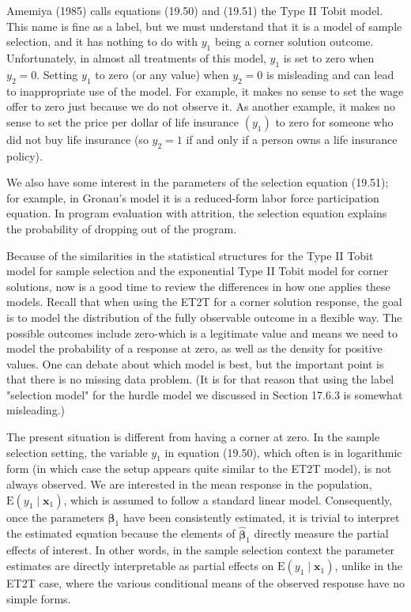 \documentclass[10pt]{article}
\begin{document}
Amemiya (1985) calls equations (19.50) and (19.51) the Type II Tobit model. This name is fine as a label, but we must understand that it is a model of sample selection, and it has nothing to do with $y_{1}$ being a corner solution outcome. Unfortunately, in almost all treatments of this model, $y_{1}$ is set to zero when $y_{2}=0$. Setting $y_{1}$ to zero (or any value) when $y_{2}=0$ is misleading and can lead to inappropriate use of the model. For example, it makes no sense to set the wage offer to zero just because we do not observe it. As another example, it makes no sense to set the price per dollar of life insurance $\left(y_{1}\right)$ to zero for someone who did not buy life insurance (so $y_{2}=1$ if and only if a person owns a life insurance policy).

We also have some interest in the parameters of the selection equation (19.51); for example, in Gronau's model it is a reduced-form labor force participation equation. In program evaluation with attrition, the selection equation explains the probability of dropping out of the program.

Because of the similarities in the statistical structures for the Type II Tobit model for sample selection and the exponential Type II Tobit model for corner solutions, now is a good time to review the differences in how one applies these models. Recall that when using the ET2T for a corner solution response, the goal is to model the distribution of the fully observable outcome in a flexible way. The possible outcomes include zero-which is a legitimate value and means we need to model the probability of a response at zero, as well as the density for positive values. One can debate about which model is best, but the important point is that there is no missing data problem. (It is for that reason that using the label "selection model" for the hurdle model we discussed in Section 17.6.3 is somewhat misleading.)

The present situation is different from having a corner at zero. In the sample selection setting, the variable $y_{1}$ in equation (19.50), which often is in logarithmic form (in which case the setup appears quite similar to the ET2T model), is not always observed. We are interested in the mean response in the population, $\mathrm{E}\left(y_{1} \mid \mathbf{x}_{1}\right)$, which is assumed to follow a standard linear model. Consequently, once the parameters $\boldsymbol{\beta}_{1}$ have been consistently estimated, it is trivial to interpret the estimated equation because the elements of $\hat{\boldsymbol{\beta}}_{1}$ directly measure the partial effects of interest. In other words, in the sample selection context the parameter estimates are directly interpretable as partial effects on $\mathrm{E}\left(y_{1} \mid \mathbf{x}_{1}\right)$, unlike in the ET2T case, where the various conditional means of the observed response have no simple forms.
\end{document}
